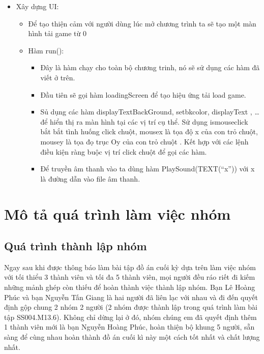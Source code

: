 \documentclass[13pt,a4paper]{article}
\begin{document}
\begin{itemize}
    \item Xây dựng UI:
    \begin{itemize}
        \item Để tạo thiện cảm với người dùng lúc mở chương trình ta sẽ tạo một màn hình tải game từ 0%
        \item Hàm run():
        \begin{itemize}
            \item  Đây là hàm chạy cho toàn bộ chương trinh, nó sẽ sử dụng các hàm đã viết ở trên.
            \item Đầu tiên sẽ gọi hàm loadingScreen để tạo hiệu ứng tải load game. 
            \item Sủ dụng các hàm displayTextBackGround, setbkcolor, displayText , … để hiển thị ra màn hình tại các vị trí cụ thể. Sử dụng ismouseclick bắt bắt tình huống click chuột, mousex là tọa độ x của con trỏ chuột, mousey là tọa đọ trục Oy của  con trỏ chuột . Kết hợp với các lệnh điều kiện ràng buộc vị trí click chuột để gọi các hàm.
            \item Để truyền âm thanh vào ta dùng hàm PlaySound(TEXT(“x”)) với x là đường dẫn vào file âm thanh.
        \end{itemize}

    \end{itemize}
 
\end{itemize}
\section{Mô tả quá trình làm việc nhóm }
\subsection{Quá trình thành lập nhóm }

Ngay sau khi được thông báo làm bài tập đồ án cuối kỳ dựa trên làm
việc nhóm với tối thiểu 3 thành viên và tối đa 5 thành viên, mọi người đều ráo riết đi kiếm những mảnh ghép còn thiếu để hoàn thành việc thành lập nhóm. Bạn Lê Hoàng Phúc và bạn Nguyễn Tấn Giang là hai người đã liên lạc với nhau và đi đến quyết định gộp chung 2 nhóm 2 người (2 nhóm được thành lập trong quá trình làm bài tập SS004.M13.6). Không chỉ dừng lại ở đó, nhóm chúng em đã quyết định thêm 1 thành viên mới là bạn Nguyễn Hoàng Phúc, hoàn thiện bộ khung 5 người, sẵn sàng để cùng nhau hoàn thành đồ án cuối kì này một cách tốt nhất và chất lượng nhất.
\end{document}
